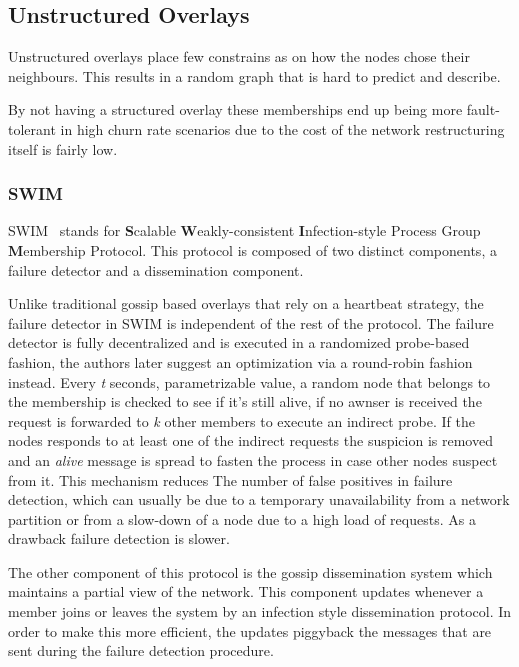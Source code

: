 \subsection{Unstructured Overlays}\label{sub:unstructured_overlays}

Unstructured overlays place few constrains as on how the nodes chose their
neighbours. This results in a random graph that is hard to predict and describe.

By not having a structured overlay these memberships end up being more fault-tolerant
in high churn rate scenarios due to the cost of the network restructuring
itself is fairly low.

\subsubsection{SWIM}\label{subsec:swim}

SWIM~\cite{swim} stands for \textbf{S}calable \textbf{W}eakly-consistent \textbf{I}nfection-style
Process Group \textbf{M}embership Protocol. This protocol is composed of two distinct
components, a failure detector and a dissemination component.

Unlike traditional gossip based overlays that rely on a heartbeat strategy,
the failure detector in SWIM is independent of the rest of the protocol.
The failure detector is fully decentralized and is executed in a randomized
probe-based fashion, the authors later suggest an optimization via a round-robin
fashion instead. Every \textit{t} seconds, parametrizable value, a random
node that belongs to the membership is checked to see if it's still alive, if
no awnser is received the request is forwarded to \textit{k} other members to
execute an indirect probe. If the nodes responds to at least one of the indirect
requests the suspicion is removed and an \textit{alive} message is spread to
fasten the process in case other nodes suspect from it.  This mechanism reduces The
number of false positives in failure detection, which can usually be due to a
temporary unavailability from a network partition or from a slow-down of a node
due to a high load of requests. As a drawback failure detection is slower.

The other component of this protocol is the gossip dissemination system which
maintains a partial view of the network. This component updates whenever a member
joins or leaves the system by an infection style dissemination protocol. In order to
make this more efficient, the updates piggyback the messages that are sent during the
failure detection procedure.

